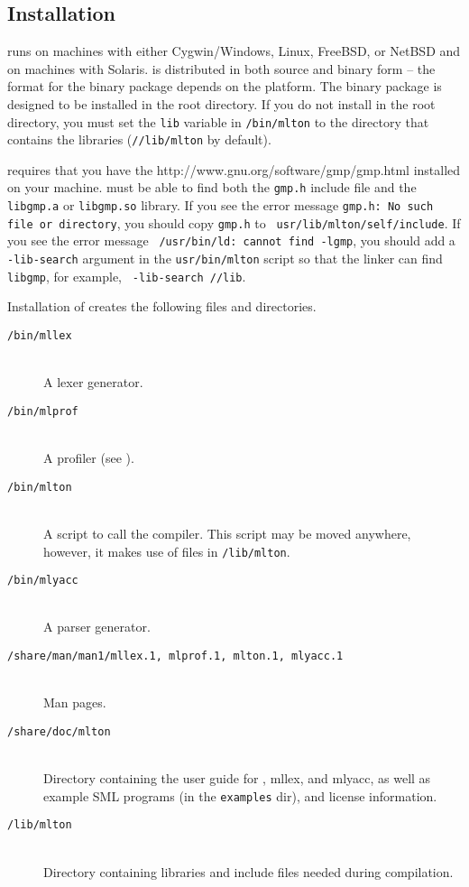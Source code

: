 %
\subsection{Installation}
%
{\mlton} runs on {\intel} machines with either Cygwin/Windows, Linux,
FreeBSD, or NetBSD and on {\sparc} machines with Solaris.  {\mlton} is
distributed in both source and binary form -- the format for the
binary package depends on the platform.  The binary package is
designed to be installed in the root directory.  If you do not install
{\mlton} in the root directory, you must set the {\tt lib} variable in
{\tt \prefix/bin/mlton} to the directory that contains the libraries
({\tt /\prefix/lib/mlton} by default).

{\mlton} requires that you have the
		  {http://www.gnu.org/software/gmp/gmp.html}
installed on your machine.  {\mlton} must be able to find both the
{\tt gmp.h} include file and the {\tt libgmp.a} or {\tt libgmp.so}
library. If you see the error message {\tt gmp.h: No such file or
directory}, you should copy {\tt gmp.h} to {\tt
usr/lib/mlton/self/include}.  If you see the error message {\tt
/usr/bin/ld: cannot find -lgmp}, you 
should add a {\tt -lib-search} argument in the {\tt usr/bin/mlton}
script so that the linker can find {\tt libgmp}, for example, {\tt
-lib-search /\prefix/lib}.

Installation of {\mlton} creates the following files and directories.

\newcommand{\place}[1]{\item[\tt #1]\hspace{1in}\\}

\begin{description}

\place{\prefix/bin/mllex}
A lexer generator.

\place{\prefix/bin/mlprof}
A profiler (see ).

\place{\prefix/bin/mlton}
A script to call the compiler.
This script may be moved anywhere, however,
it makes use of files in {\tt \prefix/lib/mlton}.

\place{\prefix/bin/mlyacc}
A parser generator.

\place{\prefix/share/man/man1/mllex.1, mlprof.1, mlton.1, mlyacc.1}
Man pages.

\place{\prefix/share/doc/mlton}
Directory containing the user guide for {\mlton}, mllex, and mlyacc,
as well as example SML programs (in the {\tt examples} dir), and
license information.

\place{\prefix/lib/mlton}
Directory containing libraries and include files needed during
compilation.

\end{description}

